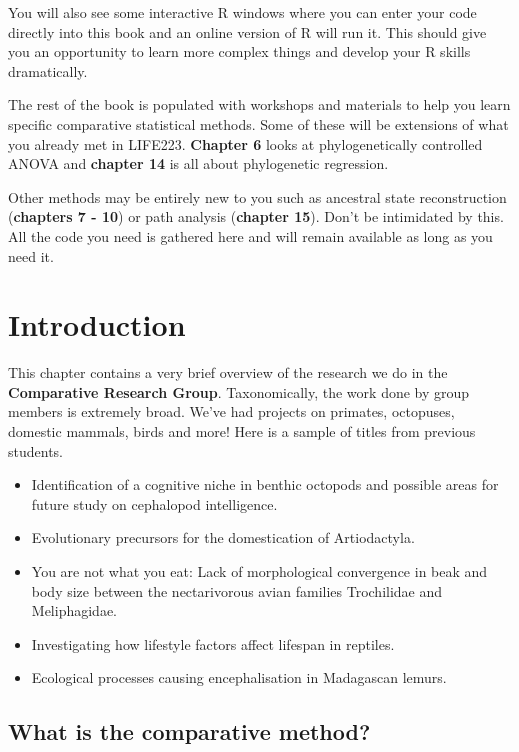 \documentclass[
]{book}
\providecommand{\tightlist}{%
  \setlength{\itemsep}{0pt}\setlength{\parskip}{0pt}}
\begin{document}
You will also see some interactive R windows where you can enter your code directly into this book and an online version of R will run it. This should give you an opportunity to learn more complex things and develop your R skills dramatically.

The rest of the book is populated with workshops and materials to help you learn specific comparative statistical methods. Some of these will be extensions of what you already met in LIFE223. \textbf{Chapter 6} looks at phylogenetically controlled ANOVA and \textbf{chapter 14} is all about phylogenetic regression.

Other methods may be entirely new to you such as ancestral state reconstruction (\textbf{chapters 7 - 10}) or path analysis (\textbf{chapter 15}). Don't be intimidated by this. All the code you need is gathered here and will remain available as long as you need it.

\hypertarget{intro}{%
\chapter{Introduction}\label{intro}}

This chapter contains a very brief overview of the research we do in the \textbf{Comparative Research Group}. Taxonomically, the work done by group members is extremely broad. We've had projects on primates, octopuses, domestic mammals, birds and more! Here is a sample of titles from previous students.

\begin{itemize}
\tightlist
\item
  Identification of a cognitive niche in benthic octopods and possible areas for future study on cephalopod intelligence.
\item
  Evolutionary precursors for the domestication of Artiodactyla.
\item
  You are not what you eat: Lack of morphological convergence in beak and body size between the nectarivorous avian families Trochilidae and Meliphagidae.
\item
  Investigating how lifestyle factors affect lifespan in reptiles.
\item
  Ecological processes causing encephalisation in Madagascan lemurs.
\end{itemize}

\hypertarget{what-is-the-comparative-method}{%
\section{What is the comparative method?}\label{what-is-the-comparative-method}}
\end{document}
